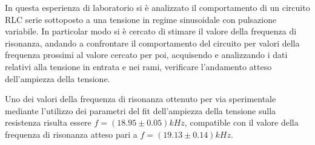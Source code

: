In questa esperienza di laboratorio si è analizzato il comportamento di un circuito RLC serie sottoposto a una tensione
in regime sinusoidale con pulsazione variabile.
In particolar modo si è cercato di stimare il valore della frequenza di risonanza, andando a confrontare il comportamento
del circuito per valori della frequenza prossimi
al valore cercato per poi, acquisendo e analizzando i dati relativi alla tensione in entrata e nei rami, verificare
l’andamento atteso dell’ampiezza della tensione.

Uno dei valori della frequenza di risonanza ottenuto per via sperimentale mediante l'utilizzo dei parametri del fit dell'ampiezza
della tensione sulla resistenza risulta essere $f = (18.95 \pm 0.05) kHz$, compatible con il valore
della frequenza di risonanza atteso pari a $f = (19.13 \pm 0.14) kHz$. %


